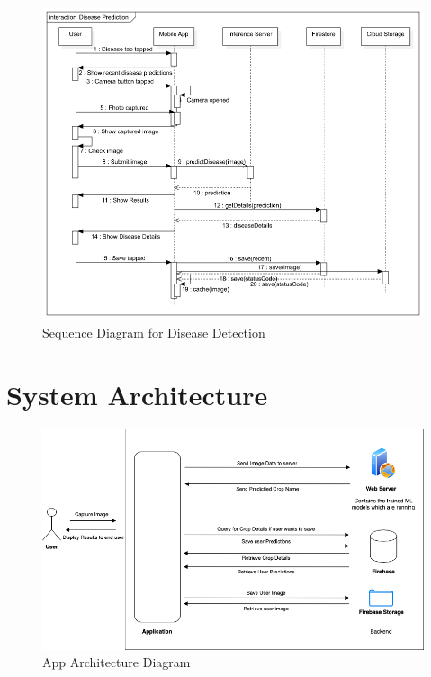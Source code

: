 \documentclass[../Report.tex]{subfiles}
\begin{document}
\begin{figure}[H]
    \centering
    \includegraphics[width=\linewidth]{images/seq_disease.png}
    \caption{Sequence Diagram for Disease Detection}
    \label{fig:seq_2}
\end{figure}

\section{System Architecture}
\begin{figure}[H]
    \centering
    \includegraphics[width=\linewidth]{images/architecture.png}
    \caption{App Architecture Diagram}
    \label{fig:architecture}
\end{figure}
\end{document}
